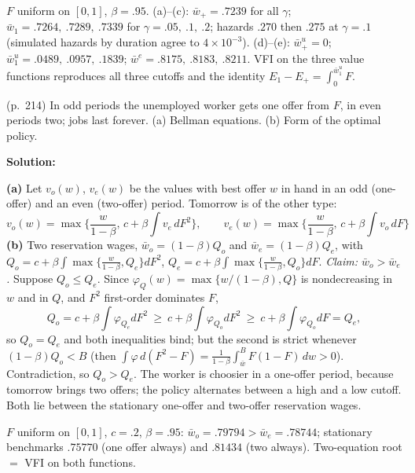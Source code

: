 \documentclass[12pt, letterpaper]{article}
\newcommand{\wb}{\bar w}
\begin{document}
\begin{tcolorbox}[evenbox,title={Exercise 6.14 \quad Temporary Unemployment Compensation}]
\begin{tcolorbox}[databox]
$F$ uniform on $[0,1]$, $\beta=.95$. (a)--(c): $\wb_+=.7239$ for all $\gamma$; $\wb_1=.7264,\ .7289,\ .7339$ for
$\gamma=.05,\ .1,\ .2$; hazards $.270$ then $.275$ at $\gamma=.1$ (simulated hazards by duration agree to
$4\times10^{-3}$). (d)--(e): $\wb^u_+=0$; $\wb^u_1=.0489,\ .0957,\ .1839$; $\wb^e=.8175,\ .8183,\ .8211$. VFI on the three
value functions reproduces all three cutoffs and the identity $E_1-E_+=\int_0^{\wb^u_1}F$.
\end{tcolorbox}
\end{tcolorbox}

\begin{tcolorbox}[oddbox,title={Exercise 6.15 \quad Seasons, I}]
\begin{tcolorbox}[questionbox]
(p.~214) In odd periods the unemployed worker gets one offer from $F$, in even periods two; jobs last
forever. (a) Bellman equations. (b) Form of the optimal policy.
\end{tcolorbox}

\textbf{Solution:}

\textbf{(a)} Let $v_o(w)$, $v_e(w)$ be the values with best offer $w$ in hand in an odd (one-offer) and an even
(two-offer) period. Tomorrow is of the other type:
\[
\boxed{v_o(w)=\max\Big\{\frac{w}{1-\beta},\,c+\beta\int v_e\,dF^2\Big\},\qquad
v_e(w)=\max\Big\{\frac{w}{1-\beta},\,c+\beta\int v_o\,dF\Big\}}
\]
\textbf{(b)} Two reservation wages, $\wb_o=(1-\beta)Q_o$ and $\wb_e=(1-\beta)Q_e$, with
$Q_o=c+\beta\int\max\{\frac{w}{1-\beta},Q_e\}dF^2$, $Q_e=c+\beta\int\max\{\frac{w}{1-\beta},Q_o\}dF$.
\emph{Claim: $\wb_o>\wb_e$.} Suppose $Q_o\le Q_e$. Since $\varphi_Q(w)=\max\{w/(1-\beta),Q\}$ is nondecreasing in $w$ and
in $Q$, and $F^2$ first-order dominates $F$,
\[
Q_o=c+\beta\!\int\!\varphi_{Q_e}dF^2\ \ge\ c+\beta\!\int\!\varphi_{Q_o}dF^2\ \ge\ c+\beta\!\int\!\varphi_{Q_o}dF=Q_e ,
\]
so $Q_o=Q_e$ and both inequalities bind; but the second is strict whenever $(1-\beta)Q_o<B$ (then
$\int\varphi\,d(F^2-F)=\frac{1}{1-\beta}\int_{\wb}^BF(1-F)\,dw>0$). Contradiction, so $Q_o>Q_e$. The worker is
choosier in a one-offer period, because tomorrow brings two offers; the policy alternates between a high
and a low cutoff. Both lie between the stationary one-offer and two-offer reservation wages.

\begin{tcolorbox}[databox]
$F$ uniform on $[0,1]$, $c=.2$, $\beta=.95$: $\wb_o=.79794>\wb_e=.78744$; stationary benchmarks
$.75770$ (one offer always) and $.81434$ (two always). Two-equation root $=$ VFI on both functions.
\end{tcolorbox}
\end{tcolorbox}
\end{document}
